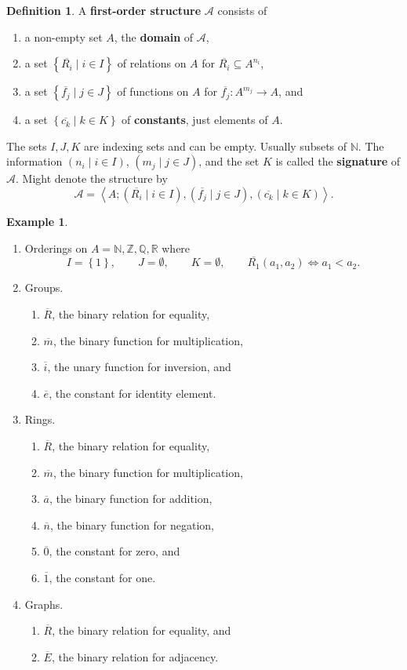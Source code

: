 \documentclass{article}
\newcommand{\N}{\mathbb{N}}
\newcommand{\Z}{\mathbb{Z}}
\newcommand{\Q}{\mathbb{Q}}
\newcommand{\R}{\mathbb{R}}
\newcommand{\A}{\mathcal{A}}
\newcommand{\rb}[1]{\left( #1 \right)}
\newcommand{\cb}[1]{\left\{ #1 \right\}}
\newcommand{\ab}[1]{\left\langle #1 \right\rangle}
\theoremstyle{definition}\newtheorem{definition}{Definition}[subsection]
\theoremstyle{definition}\newtheorem{remark}[definition]{Remark}
\theoremstyle{definition}\newtheorem*{example}{Example}
\theoremstyle{definition}\newtheorem*{note}{Note}
\begin{document}
\begin{definition}
A \textbf{first-order structure} $ \A $ consists of
\begin{enumerate}
\item a non-empty set $ A $, the \textbf{domain} of $ \A $,
\item a set $ \cb{\overline{R_i} \mid i \in I} $ of relations on $ A $ for $ \overline{R_i} \subseteq A^{n_i} $,
\item a set $ \cb{\overline{f_j} \mid j \in J} $ of functions on $ A $ for $ \overline{f_j} : A^{m_j} \to A $, and
\item a set $ \cb{\overline{c_k} \mid k \in K} $ of \textbf{constants}, just elements of $ A $.
\end{enumerate}
The sets $ I, J, K $ are indexing sets and can be empty. Usually subsets of $ \N $. The information $ \rb{n_i \mid i \in I} $, $ \rb{m_j \mid j \in J} $, and the set $ K $ is called the \textbf{signature} of $ \A $. Might denote the structure by
$$ \A = \ab{A; \rb{\overline{R_i} \mid i \in I}, \rb{\overline{f_j} \mid j \in J}, \rb{\overline{c_k} \mid k \in K}}. $$
\end{definition}

\begin{example}
\hfill
\begin{enumerate}
\item Orderings on $ A = \N, \Z, \Q, \R $ where
$$ I = \cb{1}, \qquad J = \emptyset, \qquad K = \emptyset, \qquad \overline{R_1}\rb{a_1, a_2} \iff a_1 < a_2. $$
\item Groups.
\begin{enumerate}
\item $ \overline{R} $, the binary relation for equality,
\item $ \overline{m} $, the binary function for multiplication,
\item $ \overline{i} $, the unary function for inversion, and
\item $ \overline{e} $, the constant for identity element.
\end{enumerate}
\item Rings.
\begin{enumerate}
\item $ \overline{R} $, the binary relation for equality,
\item $ \overline{m} $, the binary function for multiplication,
\item $ \overline{a} $, the binary function for addition,
\item $ \overline{n} $, the binary function for negation,
\item $ \overline{0} $, the constant for zero, and
\item $ \overline{1} $, the constant for one.
\end{enumerate}
\item Graphs.
\begin{enumerate}
\item $ \overline{R} $, the binary relation for equality, and
\item $ \overline{E} $, the binary relation for adjacency.
\end{enumerate}
\end{enumerate}
\end{example}
\end{document}
